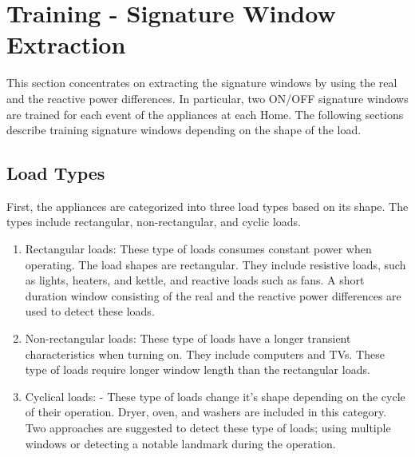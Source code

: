 \documentclass[conference]{IEEEtran}
\begin{document}
	
	
	
	
	
	
	
	\maketitle
	
	
	\section{Training - Signature Window Extraction}
	This section concentrates on extracting the signature windows by using the real and the reactive power differences.  In particular, two ON/OFF signature windows are trained for each event of the appliances at each Home.  The following sections describe training signature windows depending on the shape of the load.  
	
	\subsection{Load Types}
	First, the appliances are categorized into three load types based on its shape.  The types include rectangular, non-rectangular, and cyclic loads.  
	\begin{enumerate}
		\item{Rectangular loads:} These type of loads consumes constant power when operating.  The load shapes are rectangular.  They include resistive loads, such as lights, heaters, and kettle, and reactive loads such as fans.  A short duration window consisting of the real and the reactive power differences are used to detect these loads.
		\item{Non-rectangular loads:} These type of loads have a longer transient characteristics when turning on.  They include computers and TVs.  These type of loads require longer window length than the rectangular loads.
		\item{Cyclical loads:} - These type of loads change it's shape depending on the cycle of their operation.  Dryer, oven, and washers are included in this category.  Two approaches are suggested to detect these type of loads; using multiple windows or detecting a notable landmark during the operation.
	\end{enumerate}
	
\end{document}
